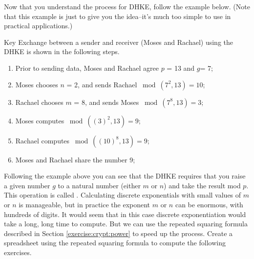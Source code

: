 Now that you understand the process for DHKE, follow the example below.  (Note that this example is just to give you the idea--it's much too simple to use in practical applications.)

 \begin{eg} Key Exchange between a sender and receiver (Moses and Rachael) using the DHKE is shown in the following steps.
\begin{enumerate}[Step 1.]
\item Prior to sending data, Moses and Rachael agree $p$ = 13 and $g$= 7; 
\item Moses chooses $n$ = 2, and sends Rachael $\bmod (7^2 , 13) = 10$;
\item Rachael chooses $m$ = 8, and sends Moses $\bmod (7^8  , 13) = 3 $;
\item Moses computes $\bmod ((3)^2 , 13 ) = 9$;
\item Rachael computes $\bmod ((10)^8 , 13 ) = 9$;
\item Moses and Rachael share the number 9;
\end{enumerate}
\end{eg}




Following the example above you can see that the DHKE requires that you raise a given number $g$ to a natural number (either $m$ or $n$) and take the result mod $p$. This operation is called . Calculating discrete exponentials with small values of $m$ or $n$ is manageable, but in practice the exponent $m$ or $n$ can be enormous, with hundreds of digits. It would seem that in this case discrete exponentiation would take a long, long time to compute.  But we can use the repeated squaring formula described in Section \ref{exercise:crypt:power} to speed up the process.  Create a spreadsheet using the repeated squaring formula to compute the following exercises.
 
